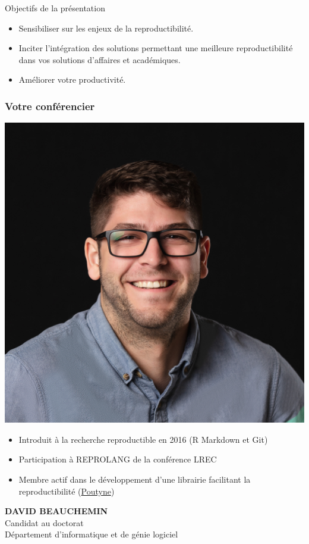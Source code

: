 \documentclass[aspectratio=169,10pt,xcolor=x11names,english,french]{beamer}
\begin{document}
	\begin{frame}{Objectifs de la présentation}
		\begin{itemize}
			\item Sensibiliser sur les enjeux de la reproductibilité.
			\item Inciter l'intégration des solutions permettant une meilleure reproductibilité dans vos solutions d'affaires et académiques.
			\item Améliorer votre productivité.
		\end{itemize}
	\end{frame}
	
	\begin{frame}
		\frametitle{Votre conférencier}
		
		\begin{minipage}{0.25\linewidth}
			\includegraphics[width=\linewidth,keepaspectratio]{img/david}
		\end{minipage}
		\hfill
		\begin{minipage}{0.70\linewidth}
			\begin{itemize}
				\item Introduit à la recherche reproductible en 2016 (R Markdown et Git)
				\item Participation à REPROLANG de la conférence LREC \cite{garneau2020robust}
				\item Membre actif dans le développement d'une librairie facilitant la reproductibilité (\href{https://poutyne.org/}{Poutyne})
			\end{itemize}
		\end{minipage}
		
		\begin{minipage}{0.25\linewidth}
			\small
			\textbf{DAVID BEAUCHEMIN} \\
			Candidat au doctorat \\
			Département d'informatique et de génie logiciel
		\end{minipage}
	\end{frame}
\end{document}
